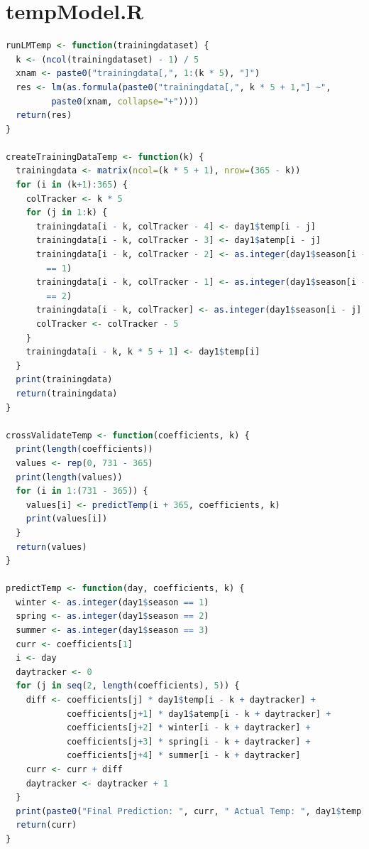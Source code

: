 \documentclass[12pt]{article}
\begin{document}
\section{tempModel.R}
\begin{lstlisting}[language=R]
runLMTemp <- function(trainingdataset) {
  k <- (ncol(trainingdataset) - 1) / 5
  xnam <- paste0("trainingdata[,", 1:(k * 5), "]")
  res <- lm(as.formula(paste0("trainingdata[,", k * 5 + 1,"] ~",
  		 paste0(xnam, collapse="+"))))
  return(res)
}

createTrainingDataTemp <- function(k) {
  trainingdata <- matrix(ncol=(k * 5 + 1), nrow=(365 - k))
  for (i in (k+1):365) {
    colTracker <- k * 5
    for (j in 1:k) {
      trainingdata[i - k, colTracker - 4] <- day1$temp[i - j]
      trainingdata[i - k, colTracker - 3] <- day1$atemp[i - j]
      trainingdata[i - k, colTracker - 2] <- as.integer(day1$season[i - j] 		
      	== 1)
      trainingdata[i - k, colTracker - 1] <- as.integer(day1$season[i - j] 
      	== 2)
      trainingdata[i - k, colTracker] <- as.integer(day1$season[i - j] == 3)
      colTracker <- colTracker - 5
    }
    trainingdata[i - k, k * 5 + 1] <- day1$temp[i]
  }
  print(trainingdata)
  return(trainingdata)
}

crossValidateTemp <- function(coefficients, k) {
  print(length(coefficients))
  values <- rep(0, 731 - 365)
  print(length(values))
  for (i in 1:(731 - 365)) {
    values[i] <- predictTemp(i + 365, coefficients, k)
    print(values[i])
  }
  return(values)
}

predictTemp <- function(day, coefficients, k) {
  winter <- as.integer(day1$season == 1)
  spring <- as.integer(day1$season == 2)
  summer <- as.integer(day1$season == 3)
  curr <- coefficients[1]
  i <- day
  daytracker <- 0
  for (j in seq(2, length(coefficients), 5)) {
    diff <- coefficients[j] * day1$temp[i - k + daytracker] +
    		coefficients[j+1] * day1$atemp[i - k + daytracker] +
    		coefficients[j+2] * winter[i - k + daytracker] + 
    		coefficients[j+3] * spring[i - k + daytracker] + 
    		coefficients[j+4] * summer[i - k + daytracker]
    curr <- curr + diff
    daytracker <- daytracker + 1
  }
  print(paste0("Final Prediction: ", curr, " Actual Temp: ", day1$temp[i]))
  return(curr)
}
\end{lstlisting}
\end{document}

